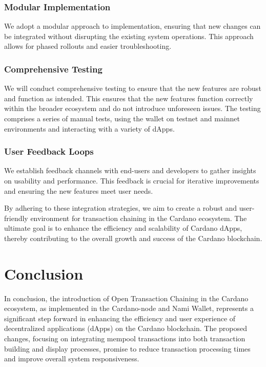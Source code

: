 \documentclass[11pt]{article}
\begin{document}
\subsubsection{Modular Implementation} 
We adopt a modular approach to implementation, ensuring that new changes can be integrated without disrupting the existing system operations.
This approach allows for phased rollouts and easier troubleshooting.

\subsubsection{Comprehensive Testing}
We will conduct comprehensive testing to ensure that the new features are robust and function as intended.
This ensures that the new features function correctly within the broader ecosystem and do not introduce unforeseen issues.
The testing comprises a series of manual tests, using the wallet on testnet and mainnet environments and interacting with a variety of dApps.

\subsubsection{User Feedback Loops}
We establish feedback channels with end-users and developers to gather insights on usability and performance.
This feedback is crucial for iterative improvements and ensuring the new features meet user needs.

By adhering to these integration strategies, we aim to create a robust and user-friendly environment for transaction chaining in the Cardano ecosystem. The ultimate goal is to enhance the efficiency and scalability of Cardano dApps, thereby contributing to the overall growth and success of the Cardano blockchain.


\section{Conclusion}

In conclusion, the introduction of Open Transaction Chaining in the Cardano ecosystem, as implemented in the Cardano-node and Nami Wallet, represents a significant step forward in enhancing the efficiency and user experience of decentralized applications (dApps) on the Cardano blockchain. The proposed changes, focusing on integrating mempool transactions into both transaction building and display processes, promise to reduce transaction processing times and improve overall system responsiveness.
\end{document}
